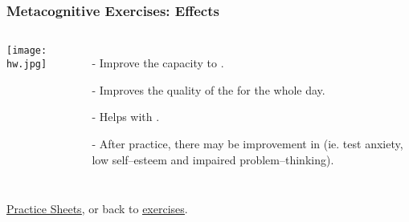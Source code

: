 \begin{frame}
\frametitle{Metacognitive Exercises: Effects}
\begin{columns}[c] %


\texttt{[image: hw.jpg]}




\pause
\begin{itemize}
\item[-] Improve the capacity to .
\item[-]  Improves the quality of the  for the whole day.
\item[-] Helps with .
\item[-] After practice, there may be improvement in  (ie. test anxiety, low self--esteem and impaired problem--thinking).
\end{itemize}
\end{columns}

\vspace{1cm}
\href{run:./Metacognitive_Exercises.pdf}{\underline{Practice Sheets}}, 
or back to \href{run:./Exercises.pdf}{\underline{exercises}}.
\end{frame}
